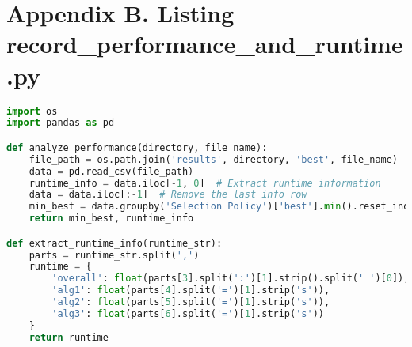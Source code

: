 \documentclass[12pt,a4paper]{article}
\begin{document}
\section*{Appendix B. Listing record\_performance\_and\_runtime.py}
\begin{lstlisting}[language=python, title=Showcase of implementation. Files are recorded using all\_stats.py.]
import os
import pandas as pd

def analyze_performance(directory, file_name):
    file_path = os.path.join('results', directory, 'best', file_name)
    data = pd.read_csv(file_path)
    runtime_info = data.iloc[-1, 0]  # Extract runtime information
    data = data.iloc[:-1]  # Remove the last info row
    min_best = data.groupby('Selection Policy')['best'].min().reset_index()
    return min_best, runtime_info

def extract_runtime_info(runtime_str):
    parts = runtime_str.split(',')
    runtime = {
        'overall': float(parts[3].split(':')[1].strip().split(' ')[0]),
        'alg1': float(parts[4].split('=')[1].strip('s')),
        'alg2': float(parts[5].split('=')[1].strip('s')),
        'alg3': float(parts[6].split('=')[1].strip('s'))
    }
    return runtime


\end{lstlisting}
\end{document}
